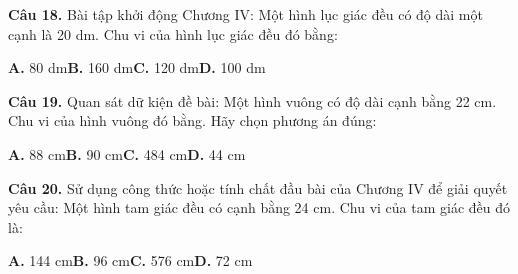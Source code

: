 \documentclass[11pt,a4paper]{article}
\begin{document}
\textbf{\color{primary} Câu 18.} Bài tập khởi động Chương IV: Một hình lục giác đều có độ dài một cạnh là 20 dm. Chu vi của hình lục giác đều đó bằng:\par
\hspace*{1.5em}\textbf{A.} 80 dm\quad\quad \textbf{B.} 160 dm\quad\quad \textbf{C.} 120 dm\quad\quad \textbf{D.} 100 dm\par\vspace{2pt}
\textbf{\color{primary} Câu 19.} Quan sát dữ kiện đề bài: Một hình vuông có độ dài cạnh bằng 22 cm. Chu vi của hình vuông đó bằng. Hãy chọn phương án đúng:\par
\hspace*{1.5em}\textbf{A.} 88 cm\quad\quad \textbf{B.} 90 cm\quad\quad \textbf{C.} 484 cm\quad\quad \textbf{D.} 44 cm\par\vspace{2pt}
\textbf{\color{primary} Câu 20.} Sử dụng công thức hoặc tính chất đầu bài của Chương IV để giải quyết yêu cầu: Một hình tam giác đều có cạnh bằng 24 cm. Chu vi của tam giác đều đó là:\par
\hspace*{1.5em}\textbf{A.} 144 cm\quad\quad \textbf{B.} 96 cm\quad\quad \textbf{C.} 576 cm\quad\quad \textbf{D.} 72 cm\par\vspace{2pt}
\end{document}
